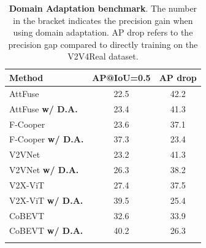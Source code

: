 \begin{table}[htb]
\centering
\setlength{\tabcolsep}{8pt}
\begin{tabular}{l|c|c}
\hline
Method  & \multicolumn{1}{c|}{AP@IoU=0.5} & \multicolumn{1}{|c}{AP drop} \\ \hline
AttFuse~\cite{xu2022opv2v} & 22.5  & 42.2                       \\
AttFuse \textbf{w/ D.A.}  & 23.4 \color{gray}{(+0.9)} & 41.3                           \\\arrayrulecolor{lightgray}\hline
F-Cooper~\cite{chen2019f} & 23.6  & 37.1                         \\
F-Cooper \textbf{w/ D.A.}   & 37.3 \color{gray}{(+13.7)} & 23.4             \\\arrayrulecolor{lightgray}\hline
V2VNet~\cite{wang2020v2vnet}   & 23.2  &  41.3                        \\
V2VNet \textbf{w/ D.A.}   & 26.3 \color{gray}{(+3.1)}  & 38.2          \\\arrayrulecolor{lightgray}\hline
V2X-ViT~\cite{xu2022v2xvit} & 27.4  &  37.5          \\
V2X-ViT \textbf{w/ D.A.}    & 39.5 \color{gray}{(+12.1)}  &  25.4      \\\arrayrulecolor{lightgray}\hline
CoBEVT~\cite{xu2022cobevt} & 32.6 &  33.9          \\
CoBEVT \textbf{w/ D.A.}   & 40.2 \color{gray}{(+7.6)} &  26.3                          \\ \arrayrulecolor{black}\hline
\end{tabular}
\vspace{-2mm}
\caption{\textbf{Domain Adaptation benchmark}. The number in the bracket indicates the precision gain when using domain adaptation. AP drop refers to the precision gap compared to directly training on the V2V4Real dataset.}
\label{tab:da}
\vspace{-3mm}
\end{table}

